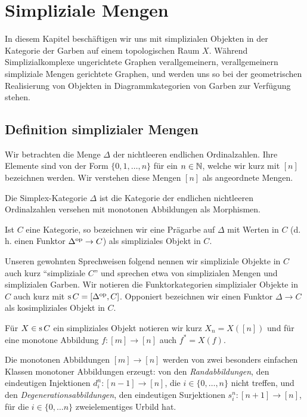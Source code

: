 
\chapter{Simpliziale Mengen}
\label{ch:simp-sets}

In diesem Kapitel beschäftigen wir uns mit simplizialen Objekten in
der Kategorie der Garben auf einem topologischen Raum $X$. Während
Simplizialkomplexe ungerichtete Graphen verallgemeinern,
verallgemeinern simpliziale Mengen gerichtete Graphen, und werden uns
so bei der geometrischen Realisierung von Objekten in
Diagrammkategorien von Garben zur Verfügung stehen.

\section{Definition simplizialer Mengen}

Wir betrachten die Menge $\Delta$ der nichtleeren endlichen
Ordinalzahlen. Ihre Elemente sind von der Form $\{0, 1, \dots, n\}$
für ein $n \in \mathbb{N}$, welche wir kurz mit $[n]$ bezeichnen werden. Wir
verstehen diese Mengen $[n]$ als angeordnete Mengen.

\begin{defn} \label{def:delta}
  Die Simplex-Kategorie $\Delta$ ist die Kategorie der endlichen
  nichtleeren Ordinalzahlen versehen mit monotonen Abbildungen als
  Morphismen.

  Ist $C$ eine Kategorie, so bezeichnen wir eine Prägarbe auf $\Delta$
  mit Werten in $C$ (d. h. einen Funktor $\Delta^\mathrm{op} \to C$) als
  simpliziales Objekt in $C$.
\end{defn}

Unseren gewohnten Sprechweisen folgend nennen wir simpliziale Objekte
in $C$ auch kurz ``simpliziale $C$'' und sprechen etwa von
simplizialen Mengen und simplizialen Garben. Wir notieren die
Funktorkategorien simplizialer Objekte in $C$ auch kurz mit $\operatorname{s} C =
[\Delta^\mathrm{op}, C]$. Opponiert bezeichnen wir einen Funktor $\Delta \to C$
als kosimpliziales Objekt in $C$.

Für $X \in \operatorname{s} C$ ein simpliziales Objekt notieren wir kurz $X_n =
X([n])$ und für eine monotone Abbildung $f: [m] \to [n]$ auch $f^* =
X(f)$.

Die monotonen Abbildungen $[m] \to [n]$ werden von zwei besonders
einfachen Klassen monotoner Abbildungen erzeugt: von den
\emph{Randabbildungen}, den eindeutigen Injektionen $d_i^n: [n - 1] \to [n]$,
die $i \in \{0, \dots, n\}$ nicht treffen, und den
\emph{Degenerationsabbildungen}, den eindeutigen Surjektionen $s_i^n: [n +
1] \to [n]$, für die $i \in \{0, \dots n\}$ zweielementiges Urbild
hat.

